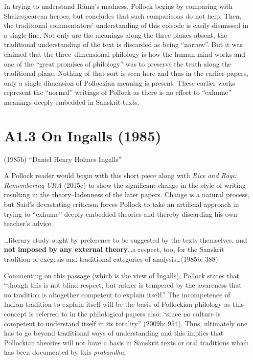 In trying to understand Rāma’s madness, Pollock begins by comparing with Shakespearean heroes, but concludes that such comparisons do not help. Then, the traditional commentators' understanding of this episode is easily dismissed in a single line. Not only are the meanings along the three planes absent, the traditional understanding of the text is discarded as being “narrow”. But it was claimed that the three–dimensional philology is how the human mind works and one of the “great promises of philology” was to preserve the truth along the traditional plane. Nothing of that sort is seen here and thus in the earlier papers, only a single dimension of Pollockian meaning is present. These earlier works represent the “normal” writings of Pollock as there is no effort to “exhume” meanings deeply embedded in Sanskrit texts.

\vspace{-.3cm}

\section*{A1.3 On Ingalls (1985)}

\vspace{-.2cm}

(1985b) “Daniel Henry Holmes Ingalls”

A Pollock reader would begin with this short piece along with \textit{Rice and Ragi: Remembering URA} (2015c) to show the significant change in the style of writing resulting in the theory–ladenness of the later papers. Change is a natural process, but Said’s devastating criticism forces Pollock to take an artificial approach in trying to “exhume” deeply embedded theories and thereby discarding his own teacher’s advice.

\begin{myquote}
…literary study ought by preference to be suggested by the texts themselves, and \textbf{not imposed by any external theory}…a respect, too, for the Sanskrit tradition of exegesis and traditional categories of analysis…(1985b: 388)
\end{myquote}

Commenting on this passage (which is the view of Ingalls), Pollock states that “though this is not blind respect, but rather is tempered by the awareness that no tradition is altogether competent to explain itself.” The incompetence of Indian tradition to explain itself will be the basis of Pollockian philology as this concept is referred to in the philological papers also: “since no culture is competent to understand itself in its totality” (2009b: 954). Thus, ultimately one has to go beyond traditional ways of understanding and this implies that Pollockian theories will not have a basis in Sanskrit texts or oral traditions which has been documented by this \textit{prabandha}.

